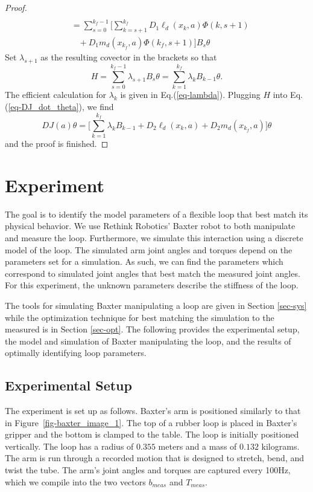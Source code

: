 \documentclass[letterpaper, 10pt, conference]{ieeeconf}
\begin{document}
\begin{proof}
\[\begin{array}{l}
\\\hspace{10pt} = \sum_{s=0}^{k_f-1}\Big[\sum_{k = s+1}^{k_f}D_1\ell_d(x_k,a) \Phi(k,s+1) \\\hspace{20pt}+ D_1m_d(x_{k_f},a)\Phi(k_f,s+1)\Big]B_s\theta
\end{array}
\]
Set $\lambda_{s+1}$ as the resulting covector in the brackets so that 
\[
H = \sum_{s=0}^{k_f-1} \lambda_{s+1} B_s\theta = \sum_{k=1}^{k_f} \lambda_{k} B_{k-1}\theta.
\]
The efficient calculation for $\lambda_k$ is given in Eq.(\ref{eq-lambda}).  Plugging $H$ into Eq.(\ref{eq-DJ_dot_theta}), we find
\[
DJ(a)\theta = \Big[\sum_{k = 1}^{k_f}\lambda_kB_{k-1} +D_2\ell_d(x_k,a) + D_2m_d(x_{k_f},a)\Big]\theta
\]
and the proof is finished.
\end{proof}

\section{Experiment}
\label{sec-experiment}
The goal is to identify the model parameters of a flexible loop that best match its physical behavior.  We use Rethink Robotics' Baxter robot to both manipulate and measure the loop.  Furthermore, we simulate this interaction using a discrete model of the loop.  The simulated arm joint angles and torques depend on the parameters set for a simulation.  As such, we can find the parameters which correspond to simulated joint angles that best match the measured joint angles.  For this experiment, the unknown parameters describe the stiffness of the loop.

The tools for simulating Baxter manipulating a loop are given in Section \ref{sec-sys} while the optimization technique for best matching the simulation to the measured is in Section \ref{sec-opt}.  The following provides the experimental setup, the model and simulation of Baxter manipulating the loop, and the results of optimally identifying loop parameters.

\subsection{Experimental Setup \label{sec-setup}}
The experiment is set up as follows.  Baxter's arm is positioned similarly to that in Figure~\ref{fig-baxter_image_1}.  The top of a rubber loop is placed in Baxter's gripper and the bottom is clamped to the table.   The loop is initially positioned vertically. The loop has a radius of $0.355$ meters and a mass of $0.132$ kilograms.  The arm is run through a recorded motion that is designed to stretch, bend, and twist the tube. The arm's joint angles and torques are captured every 100Hz, which we compile into the two vectors $b_{meas}$ and $T_{meas}$.  
\end{document}
